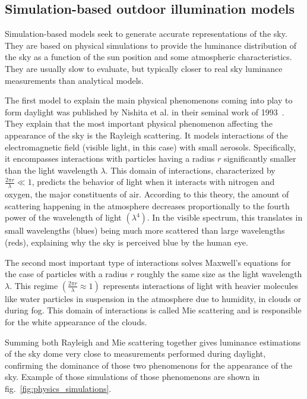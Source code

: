 \subsection{Simulation-based outdoor illumination models}

Simulation-based models seek to generate accurate representations of the sky. They are based on physical simulations to provide the luminance distribution of the sky as a function of the sun position and some atmospheric characteristics. They are usually slow to evaluate, but typically closer to real sky luminance measurements than analytical models.

The first model to explain the main physical phenomenons coming into play to form daylight was published by Nishita et al. in their seminal work of 1993~\cite{nishita1993display}. They explain that the most important physical phenomenon affecting the appearance of the sky is the Rayleigh scattering. It models interactions of the electromagnetic field (visible light, in this case) with small aerosols. Specifically, it encompasses interactions with particles having a radius $r$ significantly smaller than the light wavelength $\lambda$. This domain of interactions, characterized by $\frac{2\pi r}{\lambda} \ll 1$, predicts the behavior of light when it interacts with nitrogen and oxygen, the major constituents of air. According to this theory, the amount of scattering happening in the atmosphere decreases proportionally to the fourth power of the wavelength of light $\left(\lambda^4\right)$. In the visible spectrum, this translates in small wavelengths (blues) being much more scattered than large wavelengths (reds), explaining why the sky is perceived blue by the human eye.

The second most important type of interactions solves Maxwell's equations for the case of particles with a radius $r$ roughly the same size as the light wavelength $\lambda$. This regime $\left( \frac{2\pi r}{\lambda} \approx 1 \right)$ represents interactions of light with heavier molecules like water particles in suspension in the atmosphere due to humidity, in clouds or during fog. This domain of interactions is called Mie scattering and is responsible for the white appearance of the clouds.

Summing both Rayleigh and Mie scattering together gives luminance estimations of the sky dome very close to measurements performed during daylight, confirming the dominance of those two phenomenons for the appearance of the sky. Example of those simulations of those phenomenons are shown in fig.~\ref{fig:physics_simulations}.

